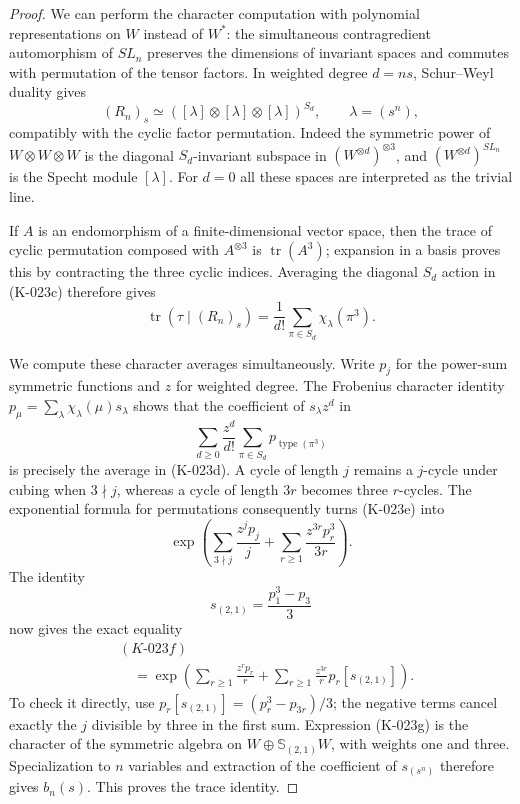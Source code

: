 \begin{proof}
We can perform the character computation with polynomial
representations on $W$ instead of $W^*$: the simultaneous
contragredient automorphism of $SL_n$ preserves the dimensions
of invariant spaces and commutes with permutation of the tensor
factors.  In weighted degree $d=ns$, Schur--Weyl duality gives
\[
 (R_n)_s\simeq
       ([\lambda]\otimes[\lambda]\otimes[\lambda])^{S_d},
       \qquad \lambda=(s^n),                              \tag{K-023c}
\]
compatibly with the cyclic factor permutation.  Indeed the
symmetric power of $W\otimes W\otimes W$ is the diagonal
$S_d$-invariant subspace in $(W^{\otimes d})^{\otimes3}$, and
$(W^{\otimes d})^{SL_n}$ is the Specht module $[\lambda]$.
For $d=0$ all these spaces are interpreted as the trivial line.

If $A$ is an endomorphism of a finite-dimensional vector space,
then the trace of cyclic permutation composed with $A^{\otimes3}$
is $\operatorname{tr}(A^3)$; expansion in a basis proves this by
contracting the three cyclic indices.  Averaging the diagonal
$S_d$ action in (K-023c) therefore gives
\[
 \operatorname{tr}(\tau\mid(R_n)_s)
   =\frac1{d!}\sum_{\pi\in S_d}\chi_\lambda(\pi^3).
                                                               \tag{K-023d}
\]

We compute these character averages simultaneously.  Write $p_j$
for the power-sum symmetric functions and $z$ for weighted degree.
The Frobenius character identity
$p_\mu=\sum_\lambda\chi_\lambda(\mu)s_\lambda$ shows that the
coefficient of $s_\lambda z^d$ in
\[
         \sum_{d\ge0}\frac{z^d}{d!}
                        \sum_{\pi\in S_d}p_{\operatorname{type}(\pi^3)}
                                                               \tag{K-023e}
\]
is precisely the average in (K-023d).  A cycle of length $j$
remains a $j$-cycle under cubing when $3\nmid j$, whereas a
cycle of length $3r$ becomes three $r$-cycles.  The exponential
formula for permutations consequently turns (K-023e) into
\[
 \exp\left(\sum_{3\nmid j}\frac{z^jp_j}{j}
                   +\sum_{r\ge1}\frac{z^{3r}p_r^3}{3r}\right).
                                                               \tag{K-023f}
\]
The identity
\[
                      s_{(2,1)}=\frac{p_1^3-p_3}{3}
\]
now gives the exact equality
\[
\begin{split}
 &(K\text{-}023f)\\
 &\quad=\exp\left(\sum_{r\ge1}\frac{z^rp_r}{r}
              +\sum_{r\ge1}\frac{z^{3r}}{r}
                         p_r[s_{(2,1)}]\right).
\end{split}                                                   \tag{K-023g}
\]
To check it directly, use
$p_r[s_{(2,1)}]=(p_r^3-p_{3r})/3$; the negative terms cancel
exactly the $j$ divisible by three in the first sum.
Expression (K-023g) is the character of the symmetric algebra
on $W\oplus\mathbb S_{(2,1)}W$, with weights one and three.
Specialization to $n$ variables and extraction of the coefficient
of $s_{(s^n)}$ therefore gives $b_n(s)$.  This proves the trace
identity.


\end{proof}
